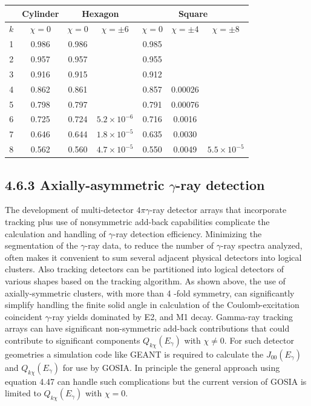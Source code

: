 \documentclass[10pt]{article}
\begin{document}
\begin{center}
\begin{tabular}{|c|c|c|c|c|c|c|}
\hline
 & Cylinder & \multicolumn{2}{|c|}{Hexagon} & \multicolumn{3}{c|}{Square} \\
\hline
$k$ & $\chi=0$ & $\chi=0$ & $\chi= \pm 6$ & $\chi=0$ & $\chi= \pm 4$ & $\chi= \pm 8$ \\
\hline
1 & 0.986 & 0.986 &  & 0.985 &  &  \\
\hline
2 & 0.957 & 0.957 &  & 0.955 &  &  \\
\hline
3 & 0.916 & 0.915 &  & 0.912 &  &  \\
\hline
4 & 0.862 & 0.861 &  & 0.857 & 0.00026 &  \\
\hline
5 & 0.798 & 0.797 &  & 0.791 & 0.00076 &  \\
\hline
6 & 0.725 & 0.724 & $5.2 \times 10^{-6}$ & 0.716 & 0.0016 &  \\
\hline
7 & 0.646 & 0.644 & $1.8 \times 10^{-5}$ & 0.635 & 0.0030 &  \\
\hline
8 & 0.562 & 0.560 & $4.7 \times 10^{-5}$ & 0.550 & 0.0049 & $5.5 \times 10^{-5}$ \\
\hline
\end{tabular}
\end{center}

\subsection*{4.6.3 Axially-asymmetric $\gamma$-ray detection}
The development of multi-detector $4 \pi \gamma$-ray detector arrays that incorporate tracking plus use of nonsymmetric add-back capabilities complicate the calculation and handling of $\gamma$-ray detection efficiency. Minimizing the segmentation of the $\gamma$-ray data, to reduce the number of $\gamma$-ray spectra analyzed, often makes it convenient to sum several adjacent physical detectors into logical clusters. Also tracking detectors can be partitioned into logical detectors of various shapes based on the tracking algorithm. As shown above, the use of axially-symmetric clusters, with more than 4 -fold symmetry, can significantly simplify handling the finite solid angle in calculation of the Coulomb-excitation coincident $\gamma$-ray yields dominated by E2, and M1 decay. Gamma-ray tracking arrays can have significant non-symmetric add-back contributions that could contribute to significant components $Q_{k \chi}\left(E_{\gamma}\right)$ with $\chi \neq 0$. For such detector geometries a simulation code like GEANT is required to calculate the $J_{00}\left(E_{\gamma}\right)$ and $Q_{k \chi}\left(E_{\gamma}\right)$ for use by GOSIA. In principle the general approach using equation 4.47 can handle such complications but the current version of GOSIA is limited to $Q_{k \chi}\left(E_{\gamma}\right)$ with $\chi=0$.
\end{document}
